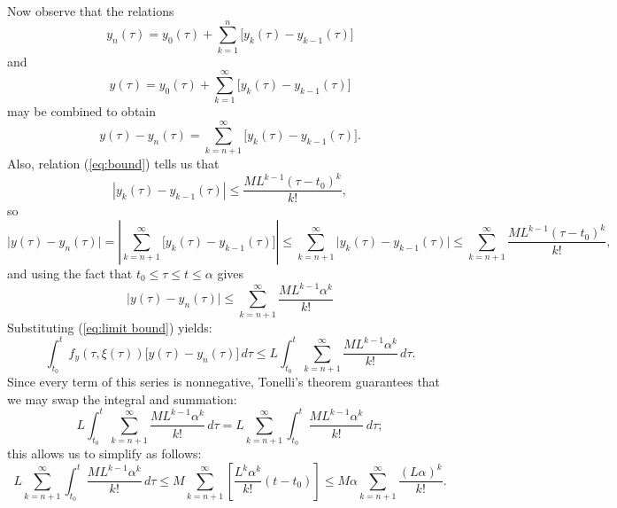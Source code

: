 \documentclass{myart}
\newcommand{\eq}[1]{(\ref{eq:#1})}
\begin{document}
Now observe that the relations
\begin{equation*}
y_n(\tau) = y_0(\tau) + \sum_{k=1}^n
                          \Big[y_k(\tau) - y_{k-1}(\tau)\Big]
\end{equation*}
and
\begin{equation*}
y(\tau) = y_0(\tau) + \sum_{k=1}^\infty
                        \Big[y_k(\tau) - y_{k-1}(\tau)\Big]
\end{equation*}
may be combined to obtain
\begin{equation*}
y(\tau) - y_n(\tau) = \sum_{k=n+1}^\infty
                        \Big[y_k(\tau) - y_{k-1}(\tau)\Big].
\end{equation*}
Also, relation \eq{bound} tells us that
\begin{equation*}
|y_k(\tau) - y_{k-1}(\tau)| \leq \frac{ML^{k-1}(\tau - t_0)^k}{k!},
\end{equation*}
so
\begin{equation*}
     \Big|y(\tau) - y_n(\tau)\Big|
   = \left|\sum_{k=n+1}^\infty
             \Big[y_k(\tau) - y_{k-1}(\tau)\Big]\right|
\leq \sum_{k=n+1}^\infty \Big|y_k(\tau) - y_{k-1}(\tau)\Big|
\leq \sum_{k=n+1}^\infty \frac{ML^{k-1}(\tau - t_0)^k}{k!},
\end{equation*}
and using the fact that $t_0 \leq \tau \leq t \leq \alpha$ gives
\begin{equation} \label{eq:limit bound}
     \Big|y(\tau) - y_n(\tau)\Big|
\leq \sum_{k=n+1}^\infty \frac{ML^{k-1}\alpha^k}{k!}
\end{equation}
Substituting \eq{limit bound} yields:
\begin{equation*}
     \int_{t_0}^t f_y(\tau, \xi(\tau))
       \Big[y(\tau) - y_n(\tau)\Big] \,d\tau
\leq L \int_{t_0}^t \sum_{k=n+1}^\infty
                      \frac{ML^{k-1}\alpha^k}{k!} \,d\tau.
\end{equation*}
Since every term of this series is nonnegative, Tonelli's theorem
guarantees that we may swap the integral and summation:
\begin{equation*}
  L \int_{t_0}^t \sum_{k=n+1}^\infty
                   \frac{ML^{k-1}\alpha^k}{k!} \,d\tau
= L \sum_{k=n+1}^\infty \int_{t_0}^t
                          \frac{ML^{k-1}\alpha^k}{k!} \,d\tau;
\end{equation*}
this allows us to simplify as follows:
\begin{equation*}
     L \sum_{k=n+1}^\infty \int_{t_0}^t
                             \frac{ML^{k-1}\alpha^k}{k!} \,d\tau
\leq M \sum_{k=n+1}^\infty
         \left[\frac{L^k\alpha^k}{k!} (t - t_0)\right]
\leq M\alpha \sum_{k=n+1}^\infty \frac{(L\alpha)^k}{k!}.
\end{equation*}
\end{document}
